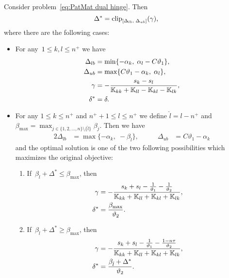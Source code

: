 \begin{theorem}\label{thm:Update rule PatMat with hinge loss}
  Consider problem~\eqref{eq:PatMat dual hinge}. Then
  \begin{equation*}
      \Delta^{*} = \clip{\Delta_{lb}}{\Delta_{ub}}{\gamma},
  \end{equation*}
  where there are the following cases:
  \begin{itemize}
    \item For any~$1\le k, l \le n^+$ we have
    \begin{align*}
      \Delta_{lb} & = \min\{- \alpha_k,\; \alpha_l - C \vartheta_1\}, \\
      \Delta_{ub} & = \max\{C \vartheta_1 - \alpha_k,\; \alpha_l\}, \\
      \gamma      & = -\frac{s_k - s_l}{\mathbb{K}_{kk} + \mathbb{K}_{ll} - \mathbb{K}_{kl} - \mathbb{K}_{lk}}, \\
      \delta^{*}  & = \delta.
    \end{align*}

    \item For any $1 \le k \le n^+$ and $n^+ + 1 \le l \le n^+$ we define $\hat{l} = l - n^+$ and~$\beta_{\max} = \max_{j \in \{1, 2, \ldots, n\} \setminus \{\hat l\}} \beta_j.$ Then we have
    \begin{alignat*}{2}
      \Delta_{lb} & = \max\{- \alpha_k,\; -\beta_{\hat{l}} \}, & \qquad
      \Delta_{ub} & = C \vartheta_1 - \alpha_k
    \end{alignat*}
    and the optimal solution is one of the two following possibilities which maximizes the original objective:
    \begin{enumerate}
      \item If~$\beta_{\hat{l}} + \Delta^{*} \leq \beta_{\max}$, then
      \begin{align*}
        \gamma & = -\frac{s_k + s_l - \frac{1}{\vartheta_1} - \frac{1}{\vartheta_2}}{\mathbb{K}_{kk} + \mathbb{K}_{ll} + \mathbb{K}_{kl} + \mathbb{K}_{lk}}, \\
        \delta^{*} & = \frac{\beta_{\max}}{\vartheta_2}.
      \end{align*}
      \item If~$\beta_{\hat{l}} + \Delta^{*} \ge \beta_{\max}$, then
      \begin{align*}
        \gamma & = -\frac{s_k + s_l - \frac{1}{\vartheta_1} - \frac{1 - n\tau}{\vartheta_2}}{\mathbb{K}_{kk} + \mathbb{K}_{ll} + \mathbb{K}_{kl} + \mathbb{K}_{lk}}, \\
        \delta^{*} & = \frac{\beta_{\hat{l}} + \Delta^{*}}{\vartheta_2}.
      \end{align*}
    \end{enumerate}


\end{itemize}
\end{theorem}
